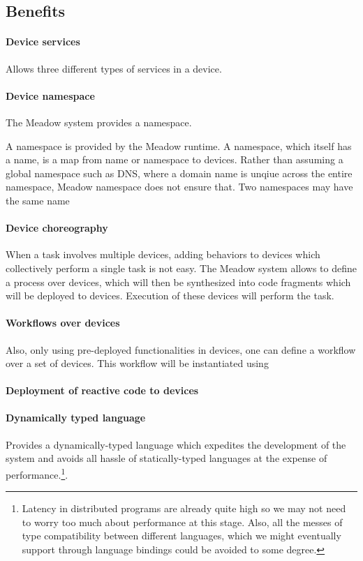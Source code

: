 \documentclass{note}
\begin{document}
\subsection{Benefits}

\paragraph{Device services}
Allows three different types of services in a device.


\paragraph{Device namespace}
The Meadow system provides a namespace. 


A namespace is provided by the Meadow runtime. 
A namespace, which itself has a name, is a map from name or namespace
to devices. 
Rather than assuming a global namespace such as DNS, where a domain name is 
unqiue across the entire namespace, Meadow namespace does not ensure that.
Two namespaces may have the same name 





\paragraph{Device choreography}
When a task involves multiple devices, adding behaviors to devices
  which collectively perform a single task is not easy. The Meadow system
  allows to define a process over devices, which will then be synthesized into
  code fragments which will be deployed to devices. Execution of these devices
  will perform the task.

\paragraph{Workflows over devices}
Also, only using pre-deployed functionalities in devices, one can define a
workflow over a set of devices. This workflow will be instantiated using 

\paragraph{Deployment of reactive code to devices}


\paragraph{Dynamically typed language}
Provides a dynamically-typed language which expedites the development of
   the system and avoids all hassle of statically-typed languages at the 
   expense of performance.\footnote{Latency in distributed programs are
     already quite high so we may not need to worry too much about performance
    at this stage. Also, all the messes of type compatibility between
    different languages, which we might eventually support through language
    bindings could be avoided to some degree.}.
\end{document}
